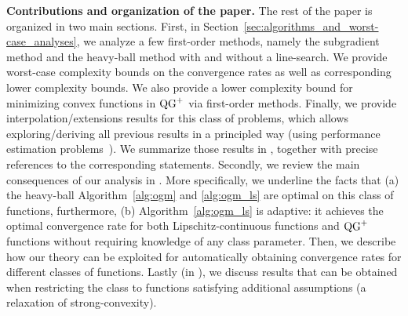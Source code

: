 


\textbf{Contributions and organization of the paper.}
The rest of the paper is organized in two main sections. First, in Section~\ref{sec:algorithms_and_worst-case_analyses}, we analyze a few first-order methods, namely the subgradient method and the heavy-ball method with and without a line-search. We provide worst-case complexity bounds on the convergence rates  as well as corresponding lower complexity bounds.
We also provide a lower complexity bound for minimizing convex functions in $\operatorname{QG}^+$ via first-order methods. Finally, we provide {interpolation/extensions} results for this class of problems, which allows exploring/deriving all previous results in a principled way (using performance estimation problems~\cite{drori2014performance,taylor2017smooth}).
We summarize those results in , together with precise references to the corresponding statements.
Secondly, we review the main consequences of our analysis in . More specifically, we underline the facts that (a) the heavy-ball Algorithm~\ref{alg:ogm} and \ref{alg:ogm_ls} are optimal on this class of functions, furthermore, (b) Algorithm~\ref{alg:ogm_ls} is  adaptive: it achieves the optimal convergence rate for both Lipschitz-continuous functions and $\operatorname{QG}^+$ functions without requiring knowledge of any class parameter. Then, we describe how our theory can be exploited for automatically obtaining convergence rates for different classes of functions. Lastly (in ), we discuss results that can be obtained when restricting the class to functions satisfying additional assumptions (a relaxation of strong-convexity).

